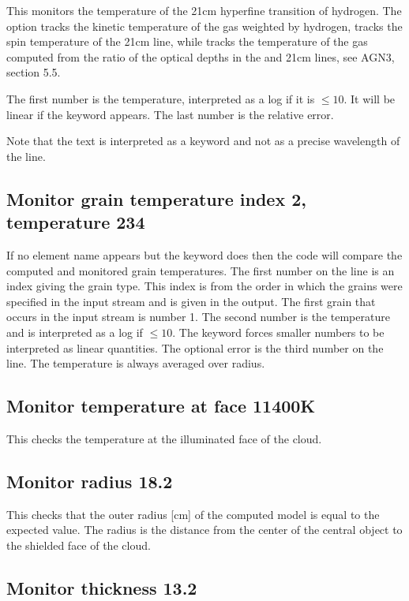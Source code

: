 This monitors the temperature of the 21cm hyperfine transition of hydrogen.
The  option tracks the kinetic temperature of the gas
weighted by hydrogen,  tracks the spin temperature of the 21cm line,
while  tracks the temperature of the gas computed from the ratio
of the optical depths in the \la{} and 21cm lines, see AGN3, section 5.5.

The first number is the temperature, interpreted as a log if
it is $\le 10$.
It will be linear if the keyword  appears.
The last number is the relative error.

Note that the text \cdCommand{21cm} is interpreted as a keyword and not as a precise wavelength
of the line.

\subsection{Monitor grain temperature index 2, temperature  234}

If no element name appears but the keyword 
does then the code
will compare the computed and monitored grain temperatures.
The first number
on the line is an index giving the grain type.
This index is from the order
in which the grains were specified in the input stream and
is given in the output.
The first grain that occurs in the input stream is number 1.
The
second number is the temperature and is interpreted as a
log if $\le 10$.
The
 keyword forces smaller numbers to be
interpreted as linear quantities.
The optional error is the third number on the line.
The temperature is
always averaged over radius.

\subsection{Monitor temperature at face 11400K}

This checks the temperature at the illuminated face of the cloud.

\subsection{Monitor radius 18.2}

This checks that the outer radius [cm] of the computed model is equal
to the expected value.
The radius is the distance from the center of the
central object to the shielded face of the cloud.

\subsection{Monitor thickness 13.2}


